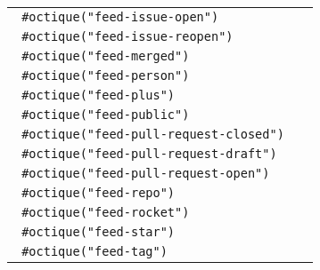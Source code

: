 \begin{longtable}[]{@{}lc@{}}
\texttt{\ \#octique("feed-issue-open")\ } &
\pandocbounded{} \\
\texttt{\ \#octique("feed-issue-reopen")\ } &
\pandocbounded{} \\
\texttt{\ \#octique("feed-merged")\ } &
\pandocbounded{} \\
\texttt{\ \#octique("feed-person")\ } &
\pandocbounded{} \\
\texttt{\ \#octique("feed-plus")\ } &
\pandocbounded{} \\
\texttt{\ \#octique("feed-public")\ } &
\pandocbounded{} \\
\texttt{\ \#octique("feed-pull-request-closed")\ } &
\pandocbounded{} \\
\texttt{\ \#octique("feed-pull-request-draft")\ } &
\pandocbounded{} \\
\texttt{\ \#octique("feed-pull-request-open")\ } &
\pandocbounded{} \\
\texttt{\ \#octique("feed-repo")\ } &
\pandocbounded{} \\
\texttt{\ \#octique("feed-rocket")\ } &
\pandocbounded{} \\
\texttt{\ \#octique("feed-star")\ } &
\pandocbounded{} \\
\texttt{\ \#octique("feed-tag")\ } &
\pandocbounded{} \\

\end{longtable}
